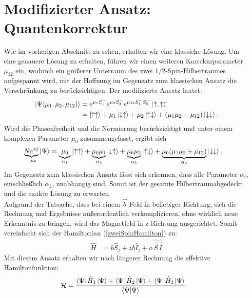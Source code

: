



\section{Modifizierter Ansatz: Quantenkorrektur}
\noindent Wie im vorherigen Abschnitt zu sehen, erhalten wir eine klassiche Lösung. Um eine genauere Lösung zu erhalten, 
führen wir einen weiteren Korrekurparameter $\mu_{12}$ ein, wodurch ein größerer Unterraum des zwei 1/2-Spin-Hilbertraumes aufgespannt 
wird, mit der Hoffnung im Gegensatz zum klassischen Ansatz die Verschränkung zu berücksichtigen. Der modifizierte Ansatz lautet:
\begin{align}
    \ket{\Psi(\mu_1,\mu_2,\mu_{12})} &= e^{\mu_1 S_1^-}e^{\mu_2 S_2^-}e^{\mu_{12} S_1^-S_2^-}\ket{\uparrow,\uparrow}\\
                                    &= \ket{\uparrow \uparrow} +\mu_1\ket{\downarrow \uparrow} + \mu_2\ket{\uparrow \downarrow} + (\mu_1\mu_2 + \mu_{12})\ket{\downarrow \downarrow}.
\end{align}
Wird  die Phasenfreiheit und die Normierung berücksichtigt und unter einem komplexen Parameter $\mu_0$ zusammengefasst, ergibt sich
\begin{align}
    \underbrace{Ne^{i\phi}}_{=\mu_0}\ket{\Psi} &= \underbrace{\mu_0}_{\alpha_1}\ket{\uparrow \uparrow} 
    + \underbrace{\mu_0\mu_1}_{\alpha_2}\ket{\downarrow \uparrow} + \underbrace{\mu_0\mu_2}_{\alpha_3}\ket{\uparrow \downarrow} 
    + \underbrace{\mu_0(\mu_1\mu_2 + \mu_{12})}_{\alpha_4}\ket{\downarrow\downarrow}.
\end{align}
Im Gegensatz zum klassischen Ansatz lässt sich erkennen, dass alle Parameter $\alpha_i$, einschließlich $\alpha_4$, unabhängig sind. Somit ist der gesamte
Hilbertraumabgedeckt und die exakte Lösung zu erwarten.\\
Aufgrund der Tatsache, dass bei einem $\vec{b}$-Feld in beliebiger Richtung, sich die Rechnung und Ergebnisse außerordentlich verkomplizieren, ohne 
wirklich neue Erkenntnis zu bringen, wird das Magnetfeld in z-Richtung ausgerichtet. Somit vereinfacht sich der 
Hamiltonian (\ref{zweiSpinHamilton}) zu:
\begin{align}\label{Hamiltonian_Bz}
    \hat{H} &= b\hat{S}_z +  zb\hat{I}_z + \alpha \hat{\vec{S}}\hat{\vec{I}}
\end{align}
Mit diesem Ansatz erhalten wir nach längerer Rechnung die effektive Hamiltonfunktion:
\begin{align}
    \mathcal{H} &= \frac{\bra{\Psi}\hat{H}_1\ket{\Psi} +\bra{\Psi}\hat{H}_2\ket{\Psi} + \bra{\Psi}\hat{H}_3\ket{\Psi}}{\bra{\Psi}\ket{\Psi}}
\end{align}
